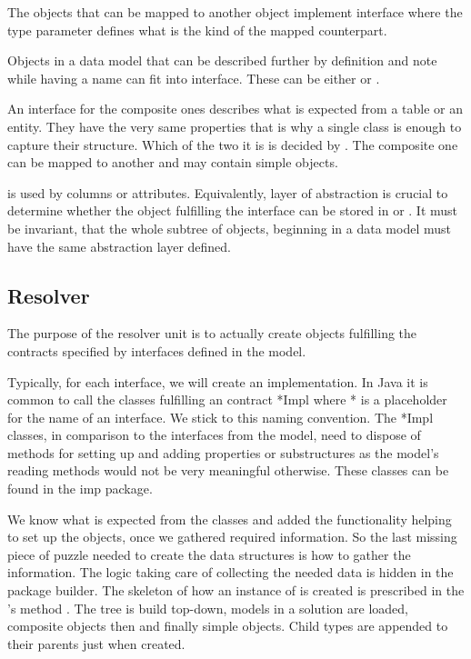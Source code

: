 The objects that can be mapped to another object implement interface  where the type parameter defines what is the kind of the mapped counterpart.

Objects in a data model that can be described further by definition and note while having a name can fit into  interface. These can be either  or .

An interface for the composite ones describes what is expected from a table or an entity.
They have the very same properties that is why a single class is enough to capture their structure. Which of the two it is is decided by .
The composite one can be mapped to another  and may contain simple objects.

 is used by columns or attributes. Equivalently, layer of abstraction is crucial to determine whether the object fulfilling the interface can be stored in  or . It must be invariant, that the whole subtree of objects, beginning in a data model must have the same abstraction layer defined.
 

\subsection{Resolver}

The purpose of the resolver unit is to actually create objects fulfilling the contracts specified by interfaces defined in the model.

Typically, for each interface, we will create an implementation. In Java it is common to call the classes fulfilling an contract *Impl where * is a placeholder for the name of an interface. We stick to this naming convention. 
The *Impl classes, in comparison to the interfaces from the model, need to dispose of methods for setting up and adding properties or substructures as the model's reading methods would not be very meaningful otherwise. These classes can be found in the imp package.

We know what is expected from the classes and added the functionality helping to set up the objects, once we gathered required information. 
So the last missing piece of puzzle needed to create the data structures is how to gather the information.
The logic taking care of collecting the needed data is hidden in the package builder.
The skeleton of how an instance of  is created is prescribed in the 's method .
The tree is build top-down, models in a solution are loaded, composite objects then and finally simple objects. Child types are appended to their parents just when created.


